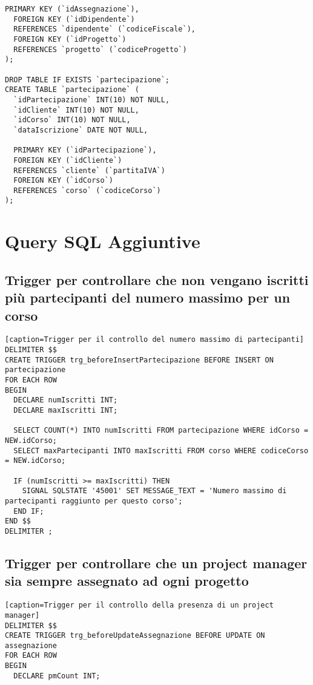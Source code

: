 \documentclass[a4paper,11pt]{article}
\begin{document}
{\begin{lstlisting}[style=SQL]
  PRIMARY KEY (`idAssegnazione`),
  FOREIGN KEY (`idDipendente`)
  REFERENCES `dipendente` (`codiceFiscale`),
  FOREIGN KEY (`idProgetto`)
  REFERENCES `progetto` (`codiceProgetto`)
);

DROP TABLE IF EXISTS `partecipazione`;
CREATE TABLE `partecipazione` (
  `idPartecipazione` INT(10) NOT NULL,
  `idCliente` INT(10) NOT NULL,
  `idCorso` INT(10) NOT NULL,
  `dataIscrizione` DATE NOT NULL,
  
  PRIMARY KEY (`idPartecipazione`),
  FOREIGN KEY (`idCliente`)
  REFERENCES `cliente` (`partitaIVA`)
  FOREIGN KEY (`idCorso`)
  REFERENCES `corso` (`codiceCorso`)
);
\end{lstlisting}
\newpage

\section{Query SQL Aggiuntive}

\subsection{Trigger per controllare che non vengano iscritti più partecipanti del numero massimo per un corso}

\begin{lstlisting}[style=SQL][caption=Trigger per il controllo del numero massimo di partecipanti]
DELIMITER $$
CREATE TRIGGER trg_beforeInsertPartecipazione BEFORE INSERT ON partecipazione
FOR EACH ROW
BEGIN
  DECLARE numIscritti INT;
  DECLARE maxIscritti INT;
  
  SELECT COUNT(*) INTO numIscritti FROM partecipazione WHERE idCorso = NEW.idCorso;
  SELECT maxPartecipanti INTO maxIscritti FROM corso WHERE codiceCorso = NEW.idCorso;
  
  IF (numIscritti >= maxIscritti) THEN
    SIGNAL SQLSTATE '45001' SET MESSAGE_TEXT = 'Numero massimo di partecipanti raggiunto per questo corso';
  END IF;
END $$
DELIMITER ;
\end{lstlisting}

\subsection{Trigger per controllare che un project manager sia sempre assegnato ad ogni progetto}

\begin{lstlisting}[style=SQL][caption=Trigger per il controllo della presenza di un project manager]
DELIMITER $$
CREATE TRIGGER trg_beforeUpdateAssegnazione BEFORE UPDATE ON assegnazione
FOR EACH ROW
BEGIN
  DECLARE pmCount INT;
  

\end{lstlisting}}
\end{document}
